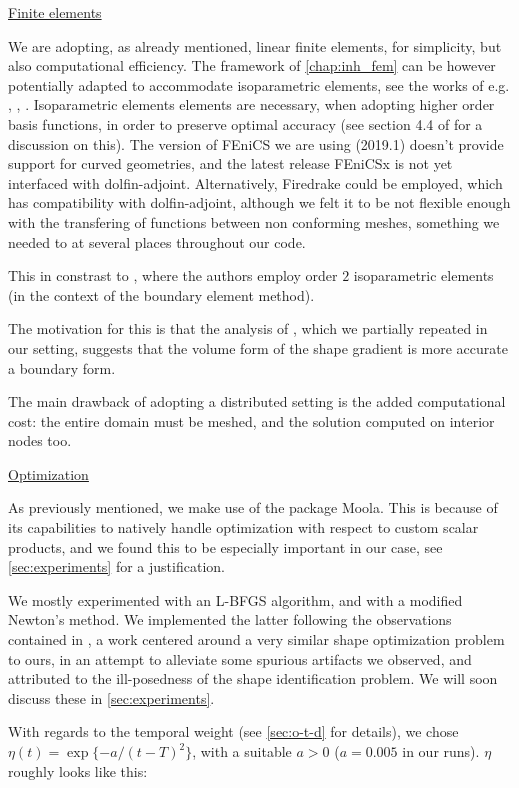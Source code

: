 \documentclass[english,a4paper,9pt,oneside]{scrbook}	%
\theoremstyle{break}
\theoremstyle{remark}
\begin{document}
\underline{Finite elements}

We are adopting, as already mentioned, linear finite elements, for simplicity, but also computational efficiency. The framework of \cref{chap:inh_fem} can be however potentially adapted to accommodate isoparametric elements, see the works of e.g. \cite{edelmann}, \cite{elliott}, \cite{ranner}. Isoparametric elements elements are necessary, when adopting higher order basis functions, in order to preserve optimal accuracy (see section 4.4 of \cite{strang} for a discussion on this). The version of FEniCS we are using (2019.1) doesn't provide support for curved geometries, and the latest release FEniCSx is not yet interfaced with dolfin-adjoint. Alternatively, Firedrake could be employed, which has compatibility with dolfin-adjoint, although we felt it to be not flexible enough with the transfering of functions between non conforming meshes, something we needed to at several places throughout our code.

This in constrast to \cite{harbrecht}, where the authors employ order $2$ isoparametric elements (in the context of the boundary element method).

The motivation for this is that the analysis of \cite{paganini}, which we partially repeated in our setting, suggests that the volume form of the shape gradient is more accurate a boundary form. 

The main drawback of adopting a distributed setting is the added computational cost: the entire domain must be meshed, and the solution computed on interior nodes too.

\underline{Optimization}

As previously mentioned, we make use of the package Moola. This is because of its capabilities to natively handle optimization with respect to custom scalar products, and we found this to be especially important in our case, see \cref{sec:experiments} for a justification.

We mostly experimented with an L-BFGS algorithm, and with a modified Newton's method. We implemented the latter following the observations contained in \cite{eppler}, a work centered around a very similar shape optimization problem to ours, in an attempt to alleviate some spurious artifacts we observed, and attributed to the ill-posedness of the shape identification problem. We will soon discuss these in \cref{sec:experiments}.

With regards to the temporal weight (see \cref{sec:o-t-d} for details), we chose $\eta(t) = \exp\{-a/(t-T)^2\}$, with a suitable $a>0$ ($a=0.005$ in our runs). $\eta$ roughly looks like this:
\end{document}
